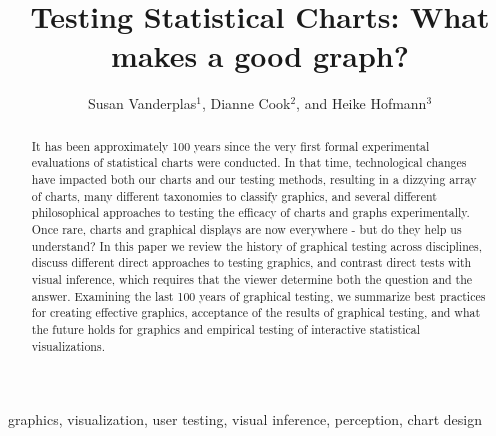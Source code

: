 \documentclass[letterpaper]{ar-1col}\usepackage[]{graphicx}\usepackage[]{color}
\begin{document}


\title{Testing Statistical Charts: What makes a good graph?}

\author{Susan Vanderplas$^1$, Dianne Cook$^2$, and  Heike Hofmann$^3$
}


\begin{abstract}
It has been approximately 100 years since the very first formal experimental evaluations of statistical charts were conducted. In that time, technological changes have impacted both our charts and our testing methods, resulting in a dizzying array of charts, many different taxonomies to classify graphics, and several different philosophical approaches to testing the efficacy of charts and graphs experimentally. Once rare, charts and graphical displays are now everywhere - but do they help us understand? In this paper we review the history of graphical testing across disciplines, discuss different direct approaches to testing graphics, and contrast direct tests with visual inference, which requires that the viewer determine both the question and the answer. Examining the last 100 years of graphical testing, we summarize best practices for creating effective graphics, acceptance of the results of graphical testing, and what the future holds for graphics and empirical testing of interactive statistical visualizations.
\end{abstract}

\begin{keywords}
graphics, visualization, user testing, visual inference, perception, chart design
\end{keywords}
\maketitle

\tableofcontents
\end{document}
